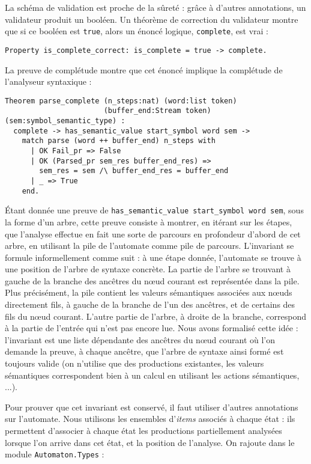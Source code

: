 \documentclass[a4paper,11pt]{article}
\begin{document}
La schéma de validation est proche de la sûreté : grâce à d'autres
annotations, un validateur produit un booléen. Un théorème de
correction du validateur montre que si ce booléen est \verb+true+,
alors un énoncé logique, \verb+complete+, est vrai :

\begin{verbatim}
Property is_complete_correct: is_complete = true -> complete.
\end{verbatim}

La preuve de complétude montre que cet énoncé implique la complétude
de l'analyseur syntaxique :

\begin{verbatim}
Theorem parse_complete (n_steps:nat) (word:list token)
                       (buffer_end:Stream token) (sem:symbol_semantic_type) :
  complete -> has_semantic_value start_symbol word sem ->
    match parse (word ++ buffer_end) n_steps with
      | OK Fail_pr => False
      | OK (Parsed_pr sem_res buffer_end_res) =>
        sem_res = sem /\ buffer_end_res = buffer_end
      | _ => True
    end.
\end{verbatim}

Étant donnée une preuve de
\verb+has_semantic_value start_symbol word sem+, sous la forme d'un arbre,
cette preuve consiste à montrer, en itérant sur les étapes, que
l'analyse effectue en fait une sorte de parcours en profondeur d'abord
de cet arbre, en utilisant la pile de l'automate comme pile
de parcours. L'invariant se formule informellement comme suit : à une
étape donnée, l'automate se trouve à une position de l'arbre de
syntaxe concrète. La partie de l'arbre se trouvant à gauche de la
branche des ancêtres du nœud courant est représentée dans la
pile. Plus précisément, la pile contient les valeurs sémantiques
associées aux nœuds directement fils, à gauche de la branche de l'un
des ancêtres, et de certains des fils du nœud courant. L'autre partie de
l'arbre, à droite de la branche, correspond à la partie de l'entrée
qui n'est pas encore lue. Nous avons formalisé cette idée :
l'invariant est une liste dépendante des ancêtres du nœud courant où
l'on demande la preuve, à chaque ancêtre, que l'arbre de syntaxe ainsi
formé est toujours valide (on n'utilise que des productions
existantes, les valeurs sémantiques correspondent bien à un calcul en
utilisant les actions sémantiques, ...).

Pour prouver que cet invariant est conservé, il faut utiliser d'autres
annotations sur l'automate. Nous utilisons les ensembles
d'\emph{items} associés à chaque état : ils permettent d'associer à
chaque état les productions partiellement analysées lorsque l'on arrive
dans cet état, et la position de l'analyse. On rajoute dans le module
\verb+Automaton.Types+ :
\end{document}
